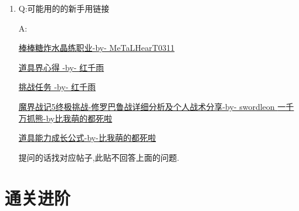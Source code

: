 \begin{enumerate}
	\item
	Q:可能用的的新手用链接

	A:

	\href{http://tieba.baidu.com/p/3717431968}{棒棒糖炸水晶练职业-by- MeTaLHearT0311}

	\href{http://tieba.baidu.com/p/3730196003}{道具界心得 -by- 红千雨}

	\href{http://tieba.baidu.com/p/3723862919}{挑战任务 -by- 红千雨}

	\href{http://tieba.baidu.com/p/3949061316}{魔界战记5终极挑战-修罗巴鲁战详细分析及个人战术分享-by- swordleon }
	\href{http://tieba.baidu.com/p/3825275063}{一千万抓熊-by比我萌的都死啦}

	\href{http://tieba.baidu.com/f?kz=3834692385}{道具能力成长公式-by-比我萌的都死啦}

	提问的话找对应帖子,此贴不回答上面的问题.


\end{enumerate}

\newpage

\section{通关进阶}


